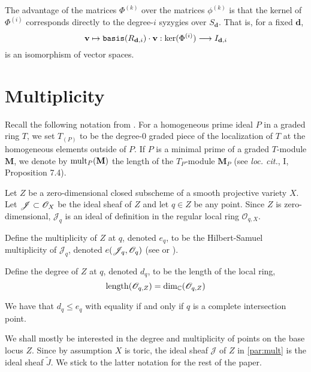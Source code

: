 \documentclass[fleqn,reqno]{amsart}
\begin{document}
\begin{paragraf}
\label{par:syzygies-kernel}
The advantage of the matrices $\Phi^{(k)}$ over the matrices $\phi^{(k)}$
is that the kernel of $\Phi^{(i)}$ corresponds directly to the degree-$i$ syzygies over $S_{\mathbf d}$.
That is, for a fixed $\mathbf d$,
\[
\mathbf v\mapsto\mathop{\tt basis}(R_{\mathbf d,i})\cdot \mathbf v:\ker(\Phi^{(i)})\longrightarrow I_{\mathbf d, i}
\]
is an isomorphism of vector spaces.
\end{paragraf}



\section{Multiplicity}
\label{sec:mult}

\begin{paragraf}
\label{par:mult-ha}
Recall the following notation from \cite{Har77}.
For a homogeneous prime ideal $P$ in a graded ring $T$,
we set $T_{(P)}$ to be the degree-$0$ graded piece of the localization of $T$
at the homogeneous elements outside of $P$.
If $P$ is a minimal prime of a graded $T$-module $\mathbf M$,
we denote by $\operatorname{mult}_P(\mathbf M)$ the length of the $T_P$-module $\mathbf M_P$
(see {\em loc. cit.}, I, Proposition 7.4).
\end{paragraf}

\begin{paragraf}
\label{par:mult}
Let $Z$ be a zero-dimensional closed subscheme of a smooth projective variety $X$.
Let $\mathscr{J}\subset\mathscr{O}_X$ be the ideal sheaf of $Z$
and let $q\in Z$ be any point.
Since $Z$ is zero-dimensional,
$\mathscr{J}_q$ is an ideal of definition
in the regular local ring $\mathscr{O}_{q,X}$.

Define the multiplicity of $Z$ at $q$, denoted $e_q$,
to be the Hilbert-Samuel multiplicity of $\mathscr{J}_q$,
denoted $e(\mathscr{J}_q,\mathscr{O}_q)$ (see \citet{Eis95} or \citet{BH98}).

Define the degree of $Z$ at $q$, denoted $d_q$, to be the length of the local ring,
\[	
	\operatorname{length}(\mathscr{O}_{q,Z})=\dim_{\mathbb{C}}(\mathscr{O}_{q,Z})
\]

We have that $d_q\leq e_q$ with equality if and only if $q$ is a complete intersection point.
\end{paragraf}

\begin{paragraf}
We shall mostly be interested in the degree and multiplicity of points on the base locus $Z$.
Since by assumption $X$ is toric, the ideal sheaf $\mathscr{J}$ of $Z$ in \eqref{par:mult}
is the ideal sheaf $\widetilde J$.
We stick to the latter notation for the rest of the paper.
\end{paragraf}
\end{document}

